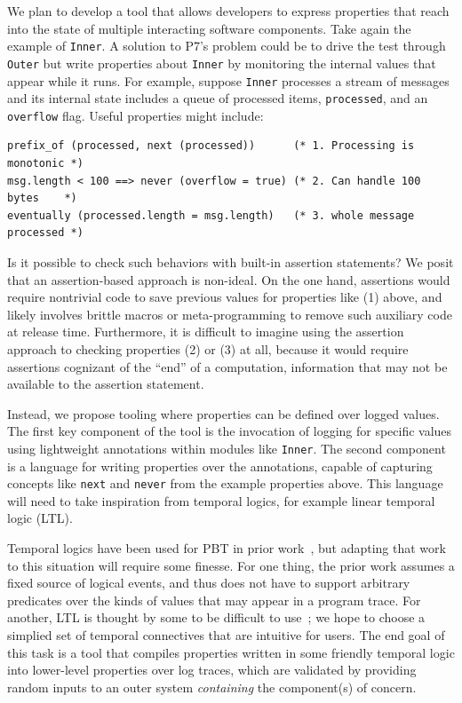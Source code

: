 We plan to develop a tool that allows developers to express properties that reach
into the state of multiple interacting software components. Take again the
example of \lstinline{Inner}. A solution to P7's problem could be to drive the
test through \lstinline{Outer} but write properties about
\lstinline{Inner} by monitoring the internal values that appear while it
runs. For example, suppose
\lstinline{Inner} processes a stream of messages and its internal state
includes a queue of processed items, \lstinline{processed}, and an
\lstinline{overflow} flag. Useful properties might include:

\begin{lstlisting}
prefix_of (processed, next (processed))      (* 1. Processing is monotonic *)
msg.length < 100 ==> never (overflow = true) (* 2. Can handle 100 bytes    *)
eventually (processed.length = msg.length)   (* 3. whole message processed *)
\end{lstlisting}

Is it possible to check such behaviors with built-in assertion statements? We
posit that an assertion-based approach is non-ideal. On the one hand, assertions
would require nontrivial code to save previous values for properties like (1)
above, and likely involves brittle macros or meta-programming to remove such
auxiliary code at release time. Furthermore, it is difficult to imagine using
the assertion approach to checking properties (2) or (3) at all, because it
would require assertions cognizant of the ``end'' of a computation, information
that may not be available to the assertion statement.

Instead, we propose tooling where properties can be defined over logged values.
The first key component of the tool is the invocation of
logging for specific values using lightweight annotations within modules like
\lstinline{Inner}. The second component is a language for writing
properties over the annotations, capable of capturing concepts like \lstinline{next} and
\lstinline{never} from the example properties above. This language will need to
take inspiration from temporal logics, for example linear temporal logic (LTL).

Temporal logics have been used for PBT in prior
work~\cite{oconnor_quickstrom_2022}, but adapting that work to this situation
will require some finesse. For one thing, the prior work assumes a fixed
source of logical events, and thus does not have to support arbitrary predicates
over the kinds of values that may appear in a program trace. For another, LTL is
thought by some to be difficult to use~\cite{greenman_little_2022};
we hope to choose a simplied set of temporal connectives that are
intuitive for users.
%
The end goal of this task is a tool that compiles properties written
in some friendly temporal logic into lower-level properties over log
traces, which are validated by providing random inputs to an outer
system \emph{containing} the component(s) of concern.

